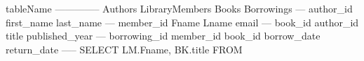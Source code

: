 tableName     
--------------
Authors       
LibraryMembers
Books         
Borrowings  
---
author_id   first_name  last_name 
---
member_id   Fname       Lname       email     
---
book_id     author_id   title       published_year
---
borrowing_id  member_id   book_id     borrow_date  return_date
-----
SELECT LM.Fname, BK.title
FROM 